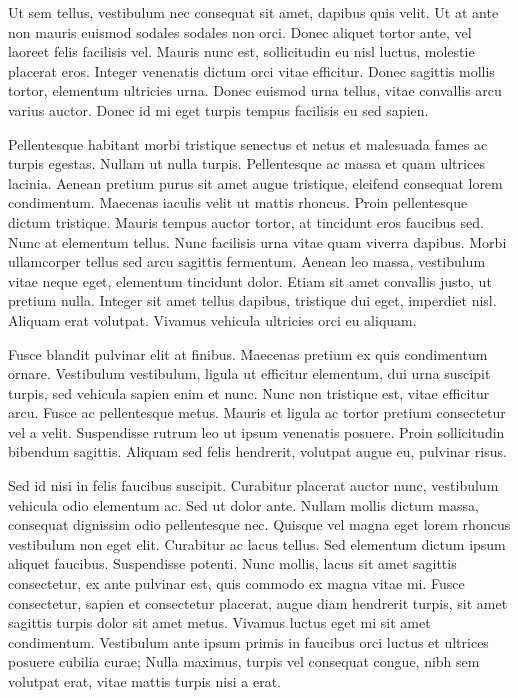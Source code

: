 Ut sem tellus, vestibulum nec consequat sit amet, dapibus quis velit. Ut at ante
non mauris euismod sodales sodales non orci. Donec aliquet tortor ante, vel
laoreet felis facilisis vel. Mauris nunc est, sollicitudin eu nisl luctus,
molestie placerat eros. Integer venenatis dictum orci vitae efficitur. Donec
sagittis mollis tortor, elementum ultricies urna. Donec euismod urna tellus,
vitae convallis arcu varius auctor. Donec id mi eget turpis tempus facilisis eu
sed sapien.

Pellentesque habitant morbi tristique senectus et netus et malesuada fames ac
turpis egestas. Nullam ut nulla turpis. Pellentesque ac massa et quam ultrices
lacinia. Aenean pretium purus sit amet augue tristique, eleifend consequat lorem
condimentum. Maecenas iaculis velit ut mattis rhoncus. Proin pellentesque dictum
tristique. Mauris tempus auctor tortor, at tincidunt eros faucibus sed. Nunc at
elementum tellus. Nunc facilisis urna vitae quam viverra dapibus. Morbi
ullamcorper tellus sed arcu sagittis fermentum. Aenean leo massa, vestibulum
vitae neque eget, elementum tincidunt dolor. Etiam sit amet convallis justo, ut
pretium nulla. Integer sit amet tellus dapibus, tristique dui eget, imperdiet
nisl. Aliquam erat volutpat. Vivamus vehicula ultricies orci eu aliquam.

Fusce blandit pulvinar elit at finibus. Maecenas pretium ex quis condimentum
ornare. Vestibulum vestibulum, ligula ut efficitur elementum, dui urna suscipit
turpis, sed vehicula sapien enim et nunc. Nunc non tristique est, vitae
efficitur arcu. Fusce ac pellentesque metus. Mauris et ligula ac tortor pretium
consectetur vel a velit. Suspendisse rutrum leo ut ipsum venenatis posuere.
Proin sollicitudin bibendum sagittis. Aliquam sed felis hendrerit, volutpat
augue eu, pulvinar risus.

Sed id nisi in felis faucibus suscipit. Curabitur placerat auctor nunc,
vestibulum vehicula odio elementum ac. Sed ut dolor ante. Nullam mollis dictum
massa, consequat dignissim odio pellentesque nec. Quisque vel magna eget lorem
rhoncus vestibulum non eget elit. Curabitur ac lacus tellus. Sed elementum
dictum ipsum aliquet faucibus. Suspendisse potenti. Nunc mollis, lacus sit amet
sagittis consectetur, ex ante pulvinar est, quis commodo ex magna vitae mi.
Fusce consectetur, sapien et consectetur placerat, augue diam hendrerit turpis,
sit amet sagittis turpis dolor sit amet metus. Vivamus luctus eget mi sit amet
condimentum. Vestibulum ante ipsum primis in faucibus orci luctus et ultrices
posuere cubilia curae; Nulla maximus, turpis vel consequat congue, nibh sem
volutpat erat, vitae mattis turpis nisi a erat.

